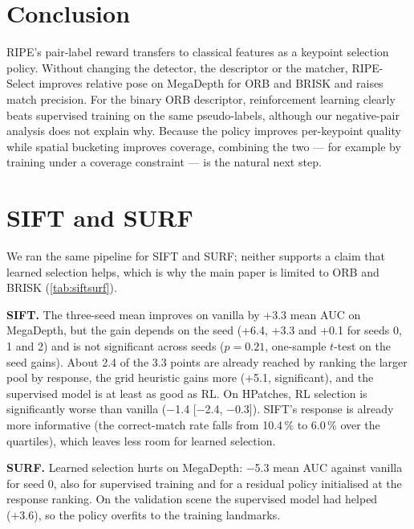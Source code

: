 \documentclass[10pt,twocolumn,letterpaper]{article}
\begin{document}
\section{Conclusion}
\label{sec:conclusion}
RIPE's pair-label reward transfers to classical features as a keypoint selection policy. Without
changing the detector, the descriptor or the matcher, RIPE-Select improves relative pose on MegaDepth
for ORB and BRISK and raises match precision. For the binary ORB descriptor, reinforcement learning clearly beats supervised
training on the same pseudo-labels, although our negative-pair analysis does not explain why. Because the policy improves per-keypoint quality
while spatial bucketing improves coverage, combining the two --- for example by training under a
coverage constraint --- is the natural next step.

{\small


}

\onecolumn
\appendix
\section{SIFT and SURF}
\label{app:siftsurf}
We ran the same pipeline for SIFT and SURF; neither supports a claim that learned selection helps, which
is why the main paper is limited to ORB and BRISK (\cref{tab:siftsurf}).

\textbf{SIFT.} The three-seed mean improves on vanilla by +3.3 mean AUC on MegaDepth, but the gain
depends on the seed (+6.4, +3.3 and +0.1 for seeds 0, 1 and 2) and is not significant across seeds
($p=0.21$, one-sample $t$-test on the seed gains). About 2.4 of the 3.3 points are already reached by
ranking the larger pool by response, the grid heuristic gains more (+5.1, significant), and the
supervised model is at least as good as RL. On HPatches, RL selection is significantly worse than
vanilla ($-$1.4 [$-$2.4, $-$0.3]). SIFT's response is already more informative (the correct-match rate
falls from 10.4\,\% to 6.0\,\% over the quartiles), which leaves less room for learned selection.

\textbf{SURF.} Learned selection hurts on MegaDepth: $-$5.3 mean AUC against vanilla for seed 0, also
for supervised training and for a residual policy initialised at the response ranking. On the
validation scene the supervised model had helped (+3.6), so the policy overfits to the training
landmarks.
\end{document}
